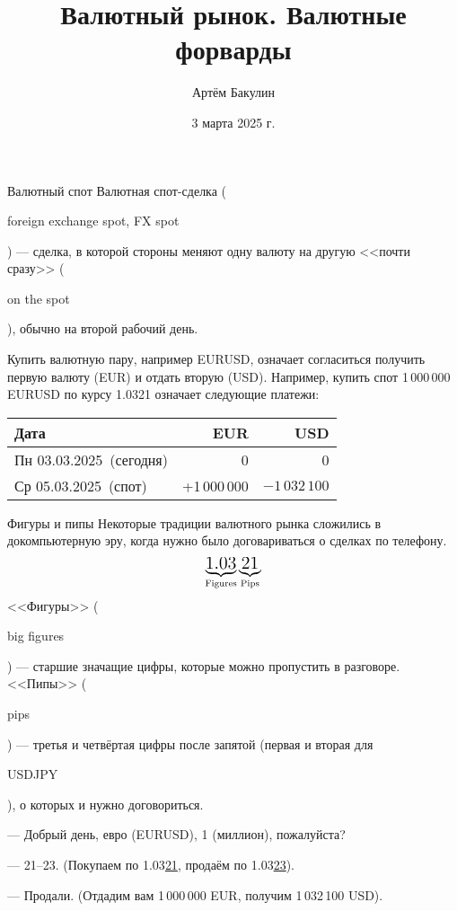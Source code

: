 \documentclass{beamer}
\title{Валютный рынок. Валютные форварды}
\author{Артём Бакулин}
\date{3 марта 2025 г.}
\newcommand{\en}[1]{\begin{otherlanguage}{english}#1\end{otherlanguage}}
\newcommand{\eurusdBigFigures}{1.03}
\newcommand{\eurusdBigFiguresPerMillion}{1\,03}
\newcommand{\eurusdBusinessDate}{Пн 03.03.2025}
\newcommand{\eurusdSpotDate}{Ср 05.03.2025}
\begin{document}
\begin{frame}
\titlepage
\end{frame}



\begin{frame}{Валютный спот}
\justify
\alert{Валютная спот-сделка} (\en{foreign exchange spot, FX spot}) --- сделка, в которой стороны меняют одну валюту на другую <<почти сразу>> (\en{on the spot}), обычно на второй рабочий день.

\justify
Купить валютную пару, например EURUSD, означает согласиться получить первую валюту (EUR) и отдать вторую (USD). Например, купить спот 1\,000\,000 EURUSD по курсу \eurusdBigFigures21 означает следующие платежи:

\justify
\centering
\begin{tabular}{l|r|r}
Дата                          & EUR & USD \\ \hline
\eurusdBusinessDate\ (сегодня)  & 0   & 0   \\
\eurusdSpotDate\ (спот)     & +1\,000\,000 & $-\eurusdBigFiguresPerMillion2\,100$
\end{tabular}
\end{frame}



\begin{frame}{Фигуры и пипы}
\justify
Некоторые традиции валютного рынка сложились в докомпьютерную эру, когда нужно
было договариваться о сделках по телефону.
\begin{align*}
\underbrace{\text{\Large \eurusdBigFigures}}_{\text{Figures}}\underbrace{\text{\Large 21}}_{\text{Pips}}
\end{align*}
\justify
<<Фигуры>> (\en{big figures}) ---  старшие значащие цифры, которые можно пропустить в 
разговоре. <<Пипы>> (\en{pips}) --- третья и четвёртая цифры после запятой (первая и вторая 
для \en{USDJPY}), о которых и нужно договориться.

\justify
--- Добрый день, евро (EURUSD), 1 (миллион), пожалуйста?

--- 21--23. (Покупаем по \eurusdBigFigures\underline{21}, продаём по \eurusdBigFigures\underline{23}).

--- Продали. (Отдадим вам 1\,000\,000 EUR, получим \eurusdBigFiguresPerMillion2\,100 USD).
\end{frame}
\end{document}
